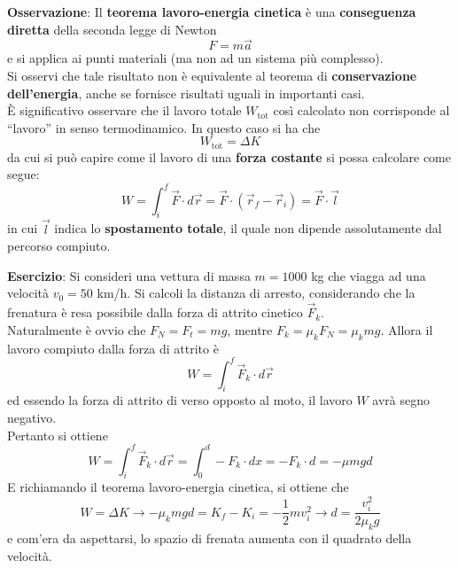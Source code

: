 \documentclass[a4paper]{extarticle}
\newcommand{\quotes}[1]{``#1''}
\begin{document}
\vspace{1em}
\noindent
\textbf{Osservazione}: Il \textbf{teorema lavoro-energia cinetica} è una \textbf{conseguenza diretta} della seconda legge di Newton
\[F = m \vec a\]
e si applica ai punti materiali (ma non ad un sistema più complesso).\\
Si osservi che tale risultato non è equivalente al teorema di \textbf{conservazione dell'energia}, anche se fornisce risultati uguali in importanti casi.\\
È significativo osservare che il lavoro totale $W_{\text{tot}}$ così calcolato non corrisponde al \quotes{lavoro} in senso termodinamico. In questo caso si ha che
\[W_{\text{tot}} = \Delta K\]
da cui si può capire come il lavoro di una \textbf{forza costante} si possa calcolare come segue:
\[\boxed{W = \int_i^f \vec F \cdot d \vec r = \vec F \cdot (\vec r_f - \vec r_i) = \vec F \cdot \vec l}\]
in cui $\vec l$ indica lo \textbf{spostamento totale}, il quale non dipende assolutamente dal percorso compiuto.

\vspace{1em}
\noindent
\textbf{Esercizio}: Si consideri una vettura di massa $m=1000$ kg che viagga ad una velocità $v_0=50$ km/h. Si calcoli la distanza di arresto, considerando che la frenatura è resa possibile dalla forza di attrito cinetico $\vec F_k$.\\
Naturalmente è ovvio che $F_N=F_t=mg$, mentre $F_k=\mu_k F_N=\mu_k mg$. Allora il lavoro compiuto dalla forza di attrito è
\[W = \int_i^f \vec F_k \cdot d \vec r\]
ed essendo la forza di attrito di verso opposto al moto, il lavoro $W$ avrà segno negativo.\\
Pertanto si ottiene
\[W = \int_i^f \vec F_k \cdot d \vec r = \int_0^d -F_k \cdot dx = -F_k \cdot d = -\mu m g d\]
E richiamando il teorema lavoro-energia cinetica, si ottiene che
\[W=\Delta K \longrightarrow -\mu_k m g d = K_f-K_i=-\frac{1}{2}mv_i^2\longrightarrow d=\frac{v_i^2}{2\mu_k g}\]
e com'era da aspettarsi, lo spazio di frenata aumenta con il quadrato della velocità.
\end{document}
